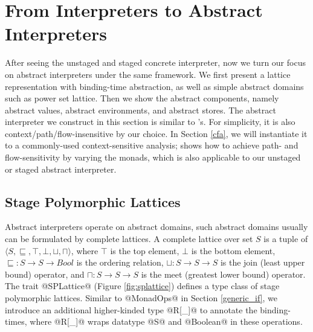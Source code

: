 \section{From Interpreters to Abstract Interpreters} \label{unstaged_abs}

After seeing the unstaged and staged concrete interpreter, now we turn our
focus on abstract interpreters under the same framework. We first present a
lattice representation with binding-time abstraction, as well as simple
abstract domains such as power set lattice.
Then we show the abstract components, namely abstract values, abstract
environments, and abstract stores.
The abstract interpreter we construct in this
section is similar to \citet{DBLP:journals/pacmpl/DaraisLNH17}'s. For
simplicity, it is also context/path/flow-insensitive by our choice. In Section
\ref{cfa}, we will instantiate it to a commonly-used context-sensitive analysis;
\citet{Darais:2015:GTM:2814270.2814308} shows how to achieve path- and
flow-sensitivity by varying the monads, which is also applicable to our unstaged
or staged abstract interpreter.

\subsection{Stage Polymorphic Lattices} \label{stagedpoly_lat}

Abstract interpreters operate on abstract domains, such abstract domains
usually can be formulated by complete lattices.
A complete lattice over set $S$ is a tuple of $\langle S, \sqsubseteq, \top,
\bot, \sqcup, \sqcap \rangle$, where $\top$ is the top element, $\bot$ is the
bottom element, $\sqsubseteq : S \to S \to Bool$ is the
ordering relation, $\sqcup: S \to S \to S$ is the join (least upper bound)
operator, and $\sqcap: S \to S \to S$ is the meet (greatest lower bound)
operator. The trait @SPLattice@ (Figure \ref{fig:splattice}) defines a type
class of stage polymorphic lattices. Similar to @MonadOps@ in Section
\ref{generic_if}, we introduce an additional higher-kinded type @R[_]@ to
annotate the binding-times, where @R[_]@ wraps datatype @S@ and @Boolean@ in
these operations.

